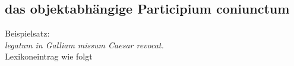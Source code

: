 \documentclass[12pt,a4paper]{article}
\begin{document}

\subsection{das objektabhängige Participium coniunctum}
Beispielsatz:\\
\textit{legatum in Galliam missum Caesar revocat.} \\
Lexikoneintrag wie folgt
\end{document}
